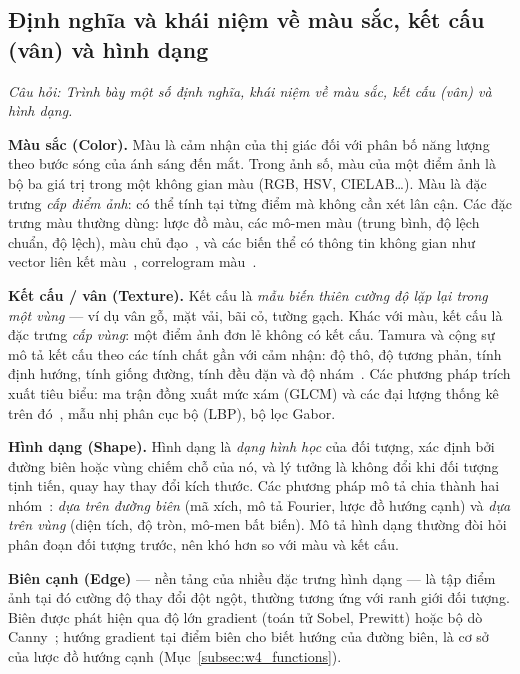 \subsection{Định nghĩa và khái niệm về màu sắc, kết cấu (vân) và hình dạng}
\label{subsec:w4_concepts}

\textit{Câu hỏi: Trình bày một số định nghĩa, khái niệm về màu sắc, kết cấu (vân) và hình dạng.}

\textbf{Màu sắc (Color).} Màu là cảm nhận của thị giác đối với phân bố năng lượng theo bước sóng của ánh sáng đến mắt. Trong ảnh số, màu của một điểm ảnh là bộ ba giá trị trong một không gian màu (RGB, HSV, CIELAB\ldots). Màu là đặc trưng \emph{cấp điểm ảnh}: có thể tính tại từng điểm mà không cần xét lân cận. Các đặc trưng màu thường dùng: lược đồ màu, các mô-men màu (trung bình, độ lệch chuẩn, độ lệch), màu chủ đạo~\citep{manjunath2001color}, và các biến thể có thông tin không gian như vector liên kết màu~\citep{pass1996comparing}, correlogram màu~\citep{huang1997image}.

\textbf{Kết cấu / vân (Texture).} Kết cấu là \emph{mẫu biến thiên cường độ lặp lại trong một vùng} — ví dụ vân gỗ, mặt vải, bãi cỏ, tường gạch. Khác với màu, kết cấu là đặc trưng \emph{cấp vùng}: một điểm ảnh đơn lẻ không có kết cấu. Tamura và cộng sự mô tả kết cấu theo các tính chất gần với cảm nhận: độ thô, độ tương phản, tính định hướng, tính giống đường, tính đều đặn và độ nhám~\citep{tamura1978textural}. Các phương pháp trích xuất tiêu biểu: ma trận đồng xuất mức xám (GLCM) và các đại lượng thống kê trên đó~\citep{haralick1973textural}, mẫu nhị phân cục bộ (LBP), bộ lọc Gabor.

\textbf{Hình dạng (Shape).} Hình dạng là \emph{dạng hình học} của đối tượng, xác định bởi đường biên hoặc vùng chiếm chỗ của nó, và lý tưởng là không đổi khi đối tượng tịnh tiến, quay hay thay đổi kích thước. Các phương pháp mô tả chia thành hai nhóm~\citep{zhang2004review}: \emph{dựa trên đường biên} (mã xích, mô tả Fourier, lược đồ hướng cạnh) và \emph{dựa trên vùng} (diện tích, độ tròn, mô-men bất biến). Mô tả hình dạng thường đòi hỏi phân đoạn đối tượng trước, nên khó hơn so với màu và kết cấu.

\textbf{Biên cạnh (Edge)} — nền tảng của nhiều đặc trưng hình dạng — là tập điểm ảnh tại đó cường độ thay đổi đột ngột, thường tương ứng với ranh giới đối tượng. Biên được phát hiện qua độ lớn gradient (toán tử Sobel, Prewitt) hoặc bộ dò Canny~\citep{canny1986computational}; hướng gradient tại điểm biên cho biết hướng của đường biên, là cơ sở của lược đồ hướng cạnh (Mục~\ref{subsec:w4_functions}).

